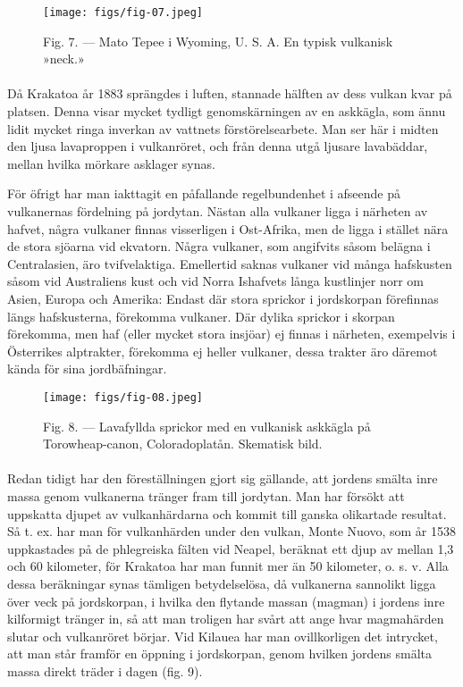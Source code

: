\documentclass[a4paper, 12pt, oneside, swedish]{article}
\begin{document}
\begin{figure}[H]
\centering
\texttt{[image: figs/fig-07.jpeg]}
\caption{Fig. 7. --- Mato Tepee i Wyoming, U. S. A. En typisk vulkanisk »neck.»}
\end{figure}
\paragraph{}
Då Krakatoa år 1883 sprängdes i luften, stannade hälften av dess vulkan kvar på platsen. Denna visar mycket tydligt genomskärningen av en askkägla, som ännu lidit mycket ringa inverkan av vattnets förstörelsearbete. Man ser här i midten den ljusa lavaproppen i vulkanröret, och från denna utgå ljusare lavabäddar, mellan hvilka mörkare asklager synas.

För öfrigt har man iakttagit en påfallande regelbundenhet i afseende på vulkanernas fördelning på jordytan. Nästan alla vulkaner ligga i närheten av hafvet, några vulkaner finnas visserligen i Ost-Afrika, men de ligga i stället nära de stora sjöarna vid ekvatorn. Några vulkaner, som angifvits såsom belägna i Centralasien, äro tvifvelaktiga. Emellertid saknas vulkaner vid många hafskusten såsom vid Australiens kust och vid Norra Ishafvets långa kustlinjer norr om Asien, Europa och Amerika: Endast där stora sprickor i jordskorpan förefinnas längs hafskusterna, förekomma vulkaner. Där dylika sprickor i skorpan förekomma, men haf (eller mycket stora insjöar) ej finnas i närheten, exempelvis i Österrikes alptrakter, förekomma ej heller vulkaner, dessa trakter äro däremot kända för sina jordbäfningar.

\begin{figure}[H]
\centering
\texttt{[image: figs/fig-08.jpeg]}
\caption{Fig. 8. --- Lavafyllda sprickor med en vulkanisk askkägla på Torowheap-canon, Coloradoplatån. Skematisk bild.}
\end{figure}
\paragraph{}
Redan tidigt har den föreställningen gjort sig gällande, att jordens smälta inre massa genom vulkanerna tränger fram till jordytan. Man har försökt att uppskatta djupet av vulkanhärdarna och kommit till ganska olikartade resultat. Så t. ex. har man för vulkanhärden under den vulkan, Monte Nuovo, som år 1538 uppkastades på de phlegreiska fälten vid Neapel, beräknat ett djup av mellan 1,3 och 60 kilometer, för Krakatoa har man funnit mer än 50 kilometer, o. s. v. Alla dessa beräkningar synas tämligen betydelselösa, då vulkanerna sannolikt ligga över veck på jordskorpan, i hvilka den flytande massan (magman) i jordens inre kilformigt tränger in, så att man troligen har svårt att ange hvar magmahärden slutar och vulkanröret börjar. Vid Kilauea har man ovillkorligen det intrycket, att man står framför en öppning i jordskorpan, genom hvilken jordens smälta massa direkt träder i dagen (fig. 9).
\end{document}
